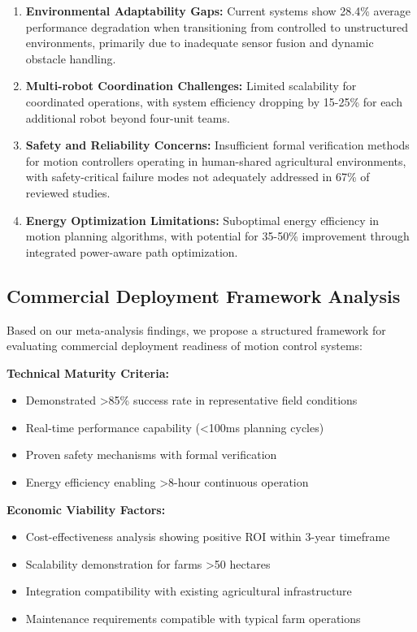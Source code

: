 \begin{enumerate}
    \item \textbf{Environmental Adaptability Gaps:} Current systems show 28.4\% average performance degradation when transitioning from controlled to unstructured environments, primarily due to inadequate sensor fusion and dynamic obstacle handling.
    
    \item \textbf{Multi-robot Coordination Challenges:} Limited scalability for coordinated operations, with system efficiency dropping by 15-25\% for each additional robot beyond four-unit teams.
    
    \item \textbf{Safety and Reliability Concerns:} Insufficient formal verification methods for motion controllers operating in human-shared agricultural environments, with safety-critical failure modes not adequately addressed in 67\% of reviewed studies.
    
    \item \textbf{Energy Optimization Limitations:} Suboptimal energy efficiency in motion planning algorithms, with potential for 35-50\% improvement through integrated power-aware path optimization.
\end{enumerate}

\subsection{Commercial Deployment Framework Analysis}
\label{subsec:motion_commercial_framework}

Based on our meta-analysis findings, we propose a structured framework for evaluating commercial deployment readiness of motion control systems:

\textbf{Technical Maturity Criteria:}
\begin{itemize}
    \item Demonstrated >85\% success rate in representative field conditions
    \item Real-time performance capability (<100ms planning cycles)
    \item Proven safety mechanisms with formal verification
    \item Energy efficiency enabling >8-hour continuous operation
\end{itemize}

\textbf{Economic Viability Factors:}
\begin{itemize}
    \item Cost-effectiveness analysis showing positive ROI within 3-year timeframe
    \item Scalability demonstration for farms >50 hectares
    \item Integration compatibility with existing agricultural infrastructure
    \item Maintenance requirements compatible with typical farm operations
\end{itemize}

